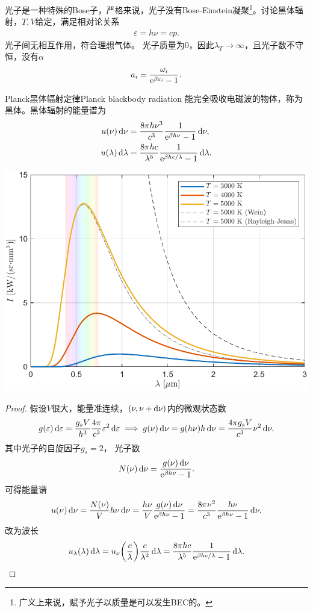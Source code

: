 光子是一种特殊的Bose子，严格来说，光子没有Bose-Einstein凝聚\footnote{广义上来说，赋予光子以质量是可以发生BEC的。}。讨论黑体辐射，$T,V$给定，满足相对论关系
\begin{align}
	\varepsilon=h\nu=cp.
\end{align}
光子间无相互作用，符合理想气体。%
光子质量为0，因此$\lambda_T\to\infty$，且光子数不守恒，没有$\alpha$
\[
	a_i=\frac{\omega_i}{\mathop{}\!\mathrm{e}^{\beta\varepsilon_i}-1}.
\]
\begin{theorem}
	{Planck黑体辐射定律}{Planck blackbody radiation}
	能完全吸收电磁波的物体，称为黑体。黑体辐射的能量谱为
	\begin{subequations}
		\begin{align}
			u(\nu)\mathop{}\!\mathrm{d}\nu&=\frac{8\pi h\nu^3}{c^3}\frac1{\mathop{}\!\mathrm{e}^{\beta h\nu}-1}\mathop{}\!\mathrm{d}\nu,\\
			u(\lambda)\mathop{}\!\mathrm{d}\lambda&=\frac{8\pi hc}{\lambda^5}\frac1{\mathop{}\!\mathrm{e}^{\beta hc/\lambda}-1}\mathop{}\!\mathrm{d}\lambda.
		\end{align}
	\end{subequations}
	\begin{center}
		\includegraphics[width=0.8\linewidth]{figures/blackbody.pdf}
		\label{fig:blackbody radiation}
	\end{center}
\end{theorem}

\begin{proof}
	假设$V$很大，能量准连续，$(\nu,\nu+\mathop{}\!\mathrm{d}\nu)$内的微观状态数
	\[
		g(\varepsilon)\mathop{}\!\mathrm{d}\varepsilon=\frac{g_sV}{h^3}\frac{4\pi}{c^3}\varepsilon^2\mathop{}\!\mathrm{d}\varepsilon\implies g(\nu)\mathop{}\!\mathrm{d}\nu=g(h\nu)h\mathop{}\!\mathrm{d}\nu=\frac{4\pi g_sV}{c^3}\nu^2\mathop{}\!\mathrm{d}\nu.
	\]
	其中光子的自旋因子$g_s=2$，
	光子数
	\[
		N(\nu)\mathop{}\!\mathrm{d}\nu=\frac{g(\nu)\mathop{}\!\mathrm{d}\nu}{\mathop{}\!\mathrm{e}^{\beta h\nu}-1}.
	\]
	可得能量谱
	\[
		u(\nu)\mathop{}\!\mathrm{d}\nu=\frac{N(\nu)}Vh\nu\mathop{}\!\mathrm{d}\nu=\frac{h\nu}V\frac{g(\nu)\mathop{}\!\mathrm{d}\nu}{\mathop{}\!\mathrm{e}^{\beta h\nu}-1}=\frac{8\pi\nu^2}{c^3}\frac{h\nu}{\mathop{}\!\mathrm{e}^{\beta h\nu}-1}\mathop{}\!\mathrm{d}\nu.
	\]
	改为波长
	\[
		u_\lambda(\lambda)\mathop{}\!\mathrm{d}\lambda=u_\nu\biggl(\frac c\lambda\biggr)\frac c{\lambda^2}\mathop{}\!\mathrm{d}\lambda=\frac{8\pi hc}{\lambda^5}\frac1{\mathop{}\!\mathrm{e}^{\beta hc/\lambda}-1}\mathop{}\!\mathrm{d}\lambda.
		\qedhere
	\]
\end{proof}

